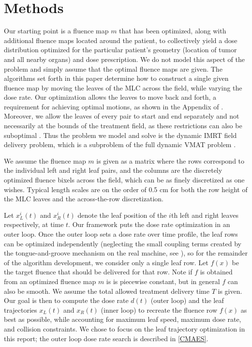 \documentclass{iopart}
\begin{document}
\section{Methods}
\label{sec:model}

Our starting point is a fluence map $m$ that has been optimized, along with additional fluence maps located around the patient, to collectively yield a dose distribution optimized for the particular patient's geometry (location of tumor and all nearby organs) and dose prescription. We do not model this aspect of the problem and simply assume that the optimal fluence maps are given. The algorithms set forth in this paper determine how to construct a single given fluence map by moving the leaves of the MLC across the field, while varying the dose rate. Our optimization allows the leaves to move back and forth, a requirement for achieving optimal motions, as shown in the Appendix of \cite{balvertcraft}. Moreover, we allow the leaves of every pair to start and end separately and not necessarily at the bounds of the treatment field, as these restrictions can also be suboptimal \cite{thesisKvA}. Thus the problem we model and solve is the dynamic IMRT field delivery problem, which is a subproblem of the full dynamic VMAT problem \cite{vmerge}.

We assume the fluence map $m$ is given as a matrix where the rows correspond to the individual left and right leaf pairs, and the columns are the discretely optimized fluence bixels across the field, which can be as finely discretized as one wishes. Typical length scales are on the order of 0.5 cm for both the row height of the MLC leaves and the across-the-row discretization.

Let $x^i_L(t)$ and $x^i_R(t)$ denote the leaf position of the $i$th left and right leaves respectively, at time $t$. Our framework puts the dose rate optimization in an outer loop. Once the outer loop sets a dose rate over time profile, the leaf rows can be optimized independently (neglecting the small coupling terms created by the tongue-and-groove mechanism on the real machine, see \cite{unkvmatreview}), so for the remainder of the algorithm development, we consider only a single leaf row. Let $f(x)$ be the target fluence that should be delivered for that row. Note if $f$ is obtained from an optimized fluence map $m$ is is piecewise constant, but in general $f$ can also be smooth. We assume the total allowed treatment delivery time $T$ is given. Our goal is then to compute the dose rate $d(t)$ (outer loop) and the leaf trajectories $x_L(t)$ and $x_R(t)$ (inner loop) to recreate the fluence row $f(x)$ as best as possible, while accounting for maximum leaf speed, maximum dose rate, and collision constraints. We chose to focus on the leaf trajectory optimization in this report; the outer loop dose rate search is described in \ref{CMAES}.
\end{document}
